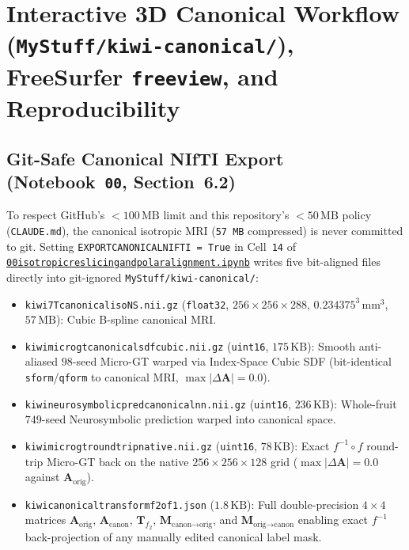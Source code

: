 \documentclass[10pt,a4paper]{article}
\renewcommand{\_}{\origunderscore\allowbreak}
\newcommand{\ghblob}{https://github.com/arvidl/BMED365-2027/blob/main}
\newcommand{\repodir}{Lab4-Comp-Imag/Kiwi-challenge/docs/neurosymbolic-report}
\newcommand{\nbref}[1]{\href{\ghblob/\repodir/notebooks/#1}{\texttt{#1}}}
\begin{document}
\clearpage
\section[Interactive 3D Canonical Workflow \& Reproducibility]{Interactive 3D Canonical Workflow (\texttt{MyStuff/kiwi-canonical/}), FreeSurfer \texttt{freeview}, and Reproducibility}
\label{app:workflow}

\subsection{Git-Safe Canonical NIfTI Export (Notebook~\texttt{00}, Section~6.2)}

To respect GitHub's $<100\,\text{MB}$ limit and this repository's $<50\,\text{MB}$ policy (\texttt{CLAUDE.md}), the canonical isotropic MRI (\texttt{57\,MB} compressed) is never committed to git. Setting \texttt{EXPORT\_CANONICAL\_NIFTI = True} in Cell~\texttt{14} of \nbref{00\_isotropic\_reslicing\_and\_polar\_alignment.ipynb} writes five bit-aligned files directly into git-ignored \texttt{MyStuff/kiwi-canonical/}:
\begin{itemize}[itemsep=0.6pt, topsep=1.5pt]
    \item \texttt{kiwi\_7T\_canonical\_iso\_NS.nii.gz} (\texttt{float32}, $256\times 256\times 288$, $0.234375^3\,\text{mm}^3$, $57\,\text{MB}$): Cubic B-spline canonical MRI.
    \item \texttt{kiwi\_micro\_gt\_canonical\_sdf\_cubic.nii.gz} (\texttt{uint16}, $175\,\text{KB}$): Smooth anti-aliased $98$-seed Micro-GT warped via Index-Space Cubic SDF (bit-identical \texttt{sform}/\texttt{qform} to canonical MRI, $\max|\Delta\mathbf{A}| = 0.0$).
    \item \texttt{kiwi\_neurosymbolic\_pred\_canonical\_nn.nii.gz} (\texttt{uint16}, $236\,\text{KB}$): Whole-fruit $749$-seed Neurosymbolic prediction warped into canonical space.
    \item \texttt{kiwi\_micro\_gt\_roundtrip\_native.nii.gz} (\texttt{uint16}, $78\,\text{KB}$): Exact $f^{-1}\circ f$ round-trip Micro-GT back on the native $256\times 256\times 128$ grid ($\max|\Delta\mathbf{A}| = 0.0$ against $\mathbf{A}_{\text{orig}}$).
    \item \texttt{kiwi\_canonical\_transform\_f2\_o\_f1.json} ($1.8\,\text{KB}$): Full double-precision $4\times 4$ matrices $\mathbf{A}_{\text{orig}}$, $\mathbf{A}_{\text{canon}}$, $\mathbf{T}_{f_2}$, $\mathbf{M}_{\text{canon}\to\text{orig}}$, and $\mathbf{M}_{\text{orig}\to\text{canon}}$ enabling exact $f^{-1}$ back-projection of any manually edited canonical label mask.
\end{itemize}
\end{document}

